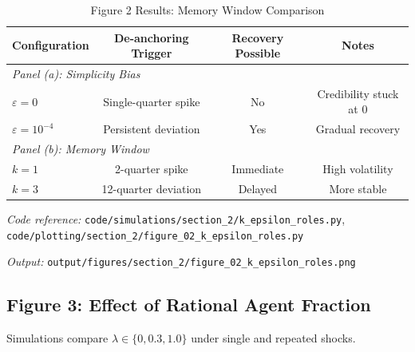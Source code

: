 \documentclass[11pt]{article}
\begin{document}
\begin{table}[htbp]
\centering
\caption{Figure 2 Results: Memory Window Comparison}
\label{tab:fig2_results}
\begin{threeparttable}
\begin{tabular}{lccc}
\toprule
Configuration & De-anchoring Trigger & Recovery Possible & Notes \\
\midrule
\multicolumn{4}{l}{\textit{Panel (a): Simplicity Bias}} \\
$\varepsilon = 0$ & Single-quarter spike & No & Credibility stuck at 0 \\
$\varepsilon = 10^{-4}$ & Persistent deviation & Yes & Gradual recovery \\
\midrule
\multicolumn{4}{l}{\textit{Panel (b): Memory Window}} \\
$k = 1$ & 2-quarter spike & Immediate & High volatility \\
$k = 3$ & 12-quarter deviation & Delayed & More stable \\
\bottomrule
\end{tabular}
\begin{tablenotes}
\small
\item \textit{Code reference:} \texttt{code/simulations/section\_2/k\_epsilon\_roles.py}, \texttt{code/plotting/section\_2/figure\_02\_k\_epsilon\_roles.py}
\item \textit{Output:} \texttt{output/figures/section\_2/figure\_02\_k\_epsilon\_roles.png}
\end{tablenotes}
\end{threeparttable}
\end{table}

\subsection{Figure 3: Effect of Rational Agent Fraction}

Simulations compare $\lambda \in \{0, 0.3, 1.0\}$ under single and repeated shocks.
\end{document}

